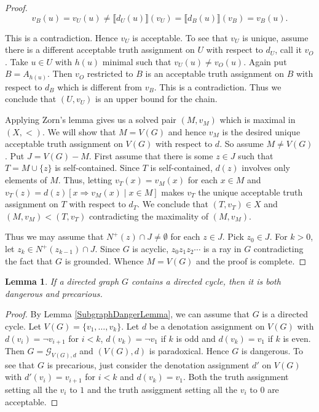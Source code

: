 \documentclass[12pt]{article}
\newtheorem{lem}[thm]{Lemma}
\theoremstyle{remark}
\newcommand{\fancy}[1]{\mathcal{#1}}
\def\G{\fancy{G}}
\begin{document}
\begin{proof}
\[v_B(u) = v_U(u) \neq \llbracket d_U(u)\rrbracket(v_U) = \llbracket d_B(u)\rrbracket(v_B) = v_B(u).\]

This is a contradiction.  Hence $v_U$ is acceptable.  To see that $v_U$ is unique, assume there is a different acceptable truth assignment on $U$ with respect to $d_U$, call it $v_O$.  Take $u \in U$ with $h(u)$ minimal such that $v_U(u) \neq v_O(u)$.  Again put $B = A_{h(u)}$.  Then $v_O$ restricted to $B$ is an acceptable truth assignment on $B$ with respect to $d_B$ which is different from $v_B$.  This is a contradiction.  Thus we conclude that $(U, v_U)$ is an upper bound for the chain.\newline

Applying Zorn's lemma gives us a solved pair $(M, v_M)$ which is maximal in $(X, <)$.  We will show that $M = V(G)$ and hence $v_M$ is the desired unique acceptable truth assignment on $V(G)$ with respect to $d$.  So assume $M \neq V(G)$.  Put $J = V(G) - M$. First assume that there is some $z \in J$ such that $T = M \cup \{z\}$ is self-contained.  Since $T$ is self-contained, $d(z)$ involves only elements of $M$.  Thus, letting $v_T(x) = v_M(x)$ for each $x \in M$ and $v_T(z) = d(z)[x \Rightarrow v_M(x) \mid x \in M]$ makes $v_T$ the unique acceptable truth assignment on $T$ with respect to $d_T$.  We conclude that $(T, v_T) \in X$ and $(M, v_M) < (T, v_T)$ contradicting the maximality of $(M, v_M)$.\newline

Thus we may assume that $N^+(z) \cap J \neq \emptyset$ for each $z \in J$.  Pick $z_0 \in J$.  For $k > 0$, let $z_k \in N^+(z_{k - 1}) \cap J$.  Since $G$ is acyclic, $z_0z_1z_2\cdots$ is a ray in $G$ contradicting the fact that $G$ is grounded.  Whence $M = V(G)$ and the proof is complete.
\end{proof}

\begin{lem}\label{DirectedCyclesMakeDanger}
If a directed graph $G$ contains a directed cycle, then it is both dangerous and precarious.
\end{lem}
\begin{proof}
By Lemma \ref{SubgraphDangerLemma}, we can assume that $G$ is a directed cycle.  Let $V(G) = \{v_1, \ldots, v_k\}$.  Let $d$ be a denotation assignment on $V(G)$ with $d(v_i) = \neg v_{i + 1}$ for $i < k$, $d(v_k) = \neg v_1$ if $k$ is odd and $d(v_k) = v_1$ if $k$ is even.  Then $G = \G_{V(G), d}$ and $(V(G), d)$ is paradoxical.  Hence $G$ is dangerous.  To see that $G$ is precarious, just consider the denotation assignment $d'$ on $V(G)$ with $d'(v_i) = v_{i + 1}$ for $i < k$ and $d(v_k) = v_1$.  Both the truth assignment setting all the $v_i$ to $1$ and the truth assiggment setting all the $v_i$ to $0$ are acceptable.
\end{proof}
\end{document}
